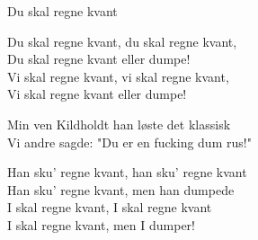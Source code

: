 \begin{song}{Du skal regne kvant}
  \begin{SBChorus}
    Du skal regne kvant, du skal regne kvant,\\
    Du skal regne kvant eller dumpe!\\
    Vi skal regne kvant, vi skal regne kvant,\\
    Vi skal regne kvant eller dumpe!
  \end{SBChorus}

  \begin{SBVerse}
    Min ven Kildholdt han løste det klassisk\\
    Vi andre sagde: "Du er en fucking dum rus!"
  \end{SBVerse}

  \begin{SBChorus}
    Han sku' regne kvant, han sku' regne kvant\\
    Han sku' regne kvant, men han dumpede\\
    I skal regne kvant, I skal regne kvant\\
    I skal regne kvant, men I dumper!
  \end{SBChorus}
\end{song}